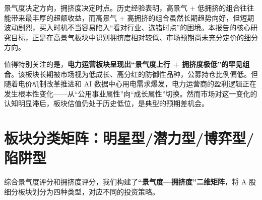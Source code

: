 \begin{keyinsight}
景气度决定方向，拥挤度决定时点。历史经验表明，高景气 + 低拥挤的组合往往能带来最丰厚的超额收益，而高景气 + 高拥挤的组合虽然长期趋势向好，但短期波动剧烈，买入时机不当容易陷入``看对行业、选错时点''的困境。本报告的核心研究目标，正是在高景气板块中识别拥挤度相对较低、市场预期尚未充分定价的细分方向。
\end{keyinsight}

值得特别关注的是，\textbf{电力运营板块呈现出``景气度上行 + 拥挤度极低''的罕见组合}。该板块长期被市场视为低成长、高分红的防御性品种，公募持仓比例偏低。但随着电价机制改革推进和 AI 数据中心用电需求爆发，电力运营商的盈利逻辑正在发生根本性变化——从``公用事业属性''向``成长属性''切换。然而市场对这一变化的认知明显滞后，板块估值仍处于历史低位，是典型的预期差机会。

\section{板块分类矩阵：明星型/潜力型/博弈型/陷阱型}

综合景气度评分和拥挤度评分，我们构建了\textbf{``景气度—拥挤度''二维矩阵}，将 A 股细分板块划分为四种类型，对应不同的投资策略。

